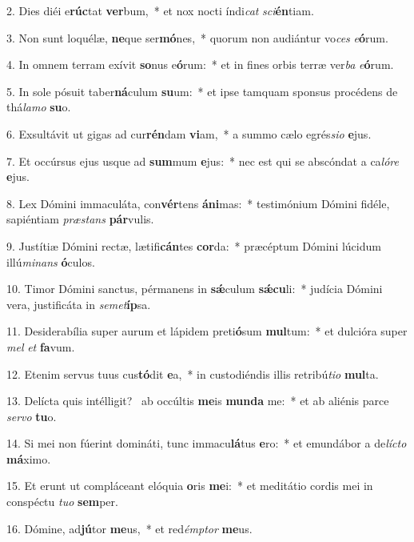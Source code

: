 2. Dies diéi e\textbf{rúc}tat \textbf{ver}bum,~*  et nox nocti índi\textit{cat} \textit{sci}\textbf{én}tiam.\

3. Non sunt loquélæ, \textbf{ne}que ser\textbf{mó}nes,~*  quorum non audiántur vo\textit{ces} \textit{e}\textbf{ó}rum.\

4. In omnem terram exívit \textbf{so}nus e\textbf{ó}rum:~*  et in fines orbis terræ ver\textit{ba} \textit{e}\textbf{ó}rum.\

5. In sole pósuit taber\textbf{ná}culum \textbf{su}um:~*  et ipse tamquam sponsus procédens de thá\textit{la}\textit{mo} \textbf{su}o.\

6. Exsultávit ut gigas ad cur\textbf{rén}dam \textbf{vi}am,~*  a summo cælo egrés\textit{si}\textit{o} \textbf{e}jus.\

7. Et occúrsus ejus usque ad \textbf{sum}mum \textbf{e}jus:~*  nec est qui se abscóndat a ca\textit{ló}\textit{re} \textbf{e}jus.\

8. Lex Dómini immaculáta, con\textbf{vér}tens \textbf{á}\textbf{ni}mas:~*  testimónium Dómini fidéle, sapiéntiam \textit{præ}\textit{stans} \textbf{pár}vulis.\

9. Justítiæ Dómini rectæ, lætifi\textbf{cán}tes \textbf{cor}da:~*  præcéptum Dómini lúcidum illú\textit{mi}\textit{nans} \textbf{ó}culos.\

10. Timor Dómini sanctus, pérmanens in \textbf{sǽ}culum \textbf{sǽ}\textbf{cu}li:~*  judícia Dómini vera, justificáta in \textit{se}\textit{met}\textbf{íp}sa.\

11. Desiderabília super aurum et lápidem preti\textbf{ó}sum \textbf{mul}tum:~*  et dulcióra super \textit{mel} \textit{et} \textbf{fa}vum.\

12. Etenim servus tuus cus\textbf{tó}dit \textbf{e}a,~*  in custodiéndis illis retribú\textit{ti}\textit{o} \textbf{mul}ta.\

13. Delícta quis intélligit? \dag\  ab occúltis \textbf{me}is \textbf{mun}\textbf{da} me:~*  et ab aliénis parce \textit{ser}\textit{vo} \textbf{tu}o.\

14. Si mei non fúerint domináti, tunc immacu\textbf{lá}tus \textbf{e}ro:~*  et emundábor a de\textit{líc}\textit{to} \textbf{má}ximo.\

15. Et erunt ut compláceant elóquia \textbf{o}ris \textbf{me}i:~*  et meditátio cordis mei in conspéctu \textit{tu}\textit{o} \textbf{sem}per.\

16. Dómine, ad\textbf{jú}tor \textbf{me}us,~*  et red\textit{émp}\textit{tor} \textbf{me}us.\

